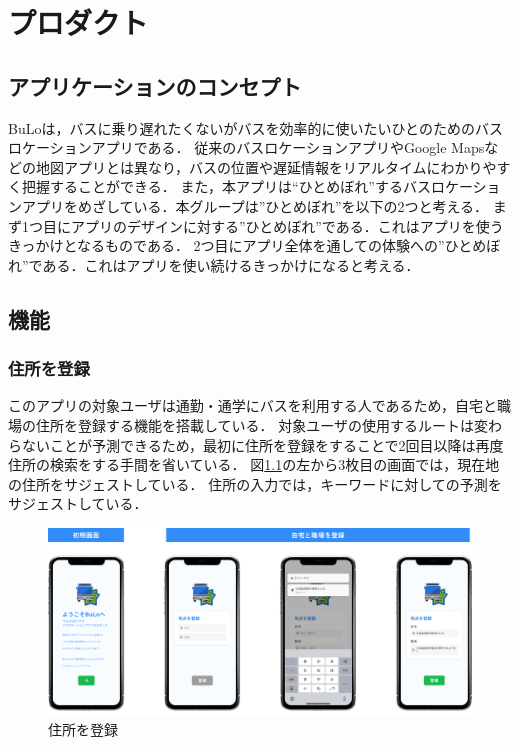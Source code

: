 \chapter{プロダクト}

\section{アプリケーションのコンセプト}
BuLoは，バスに乗り遅れたくないがバスを効率的に使いたいひとのためのバスロケーションアプリである．
従来のバスロケーションアプリやGoogle Mapsなどの地図アプリとは異なり，バスの位置や遅延情報をリアルタイムにわかりやすく把握することができる．
また，本アプリは“ひとめぼれ”するバスロケーションアプリをめざしている．本グループは”ひとめぼれ”を以下の2つと考える．
まず1つ目にアプリのデザインに対する”ひとめぼれ”である．これはアプリを使うきっかけとなるものである．
2つ目にアプリ全体を通しての体験への”ひとめぼれ”である．これはアプリを使い続けるきっかけになると考える．

\section{機能}
\subsection{住所を登録}
    このアプリの対象ユーザは通勤・通学にバスを利用する人であるため，自宅と職場の住所を登録する機能を搭載している．
    対象ユーザの使用するルートは変わらないことが予測できるため，最初に住所を登録をすることで2回目以降は再度住所の検索をする手間を省いている．
    図\ref{fig:feature_register}の左から3枚目の画面では，現在地の住所をサジェストしている．
    住所の入力では，キーワードに対しての予測をサジェストしている．
    \pagebreak
    \begin{figure}
        \centering
        \includegraphics[width=14cm]{images/feature_register.png}
        \caption{住所を登録}
        \label{fig:feature_register}
    \end{figure}
